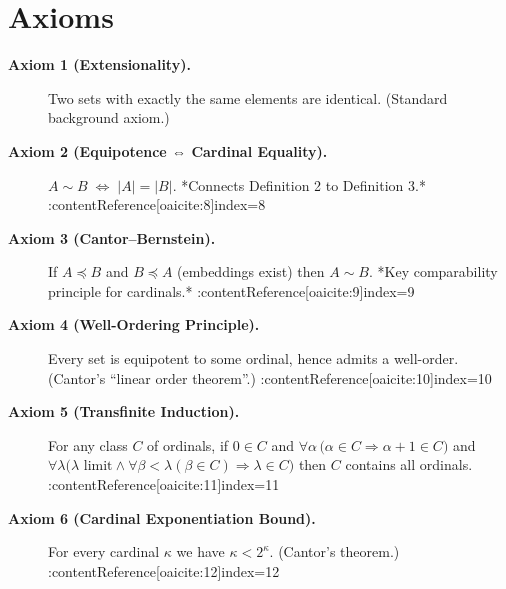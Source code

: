 \documentclass[11pt]{article}
\begin{document}
\section*{Axioms}
\begin{description}

\item[\textbf{Axiom 1 (Extensionality).}]
Two sets with exactly the same elements are identical.  (Standard
background axiom.)

\item[\textbf{Axiom 2 (Equipotence ⇔ Cardinal Equality).}]
$A\sim B \;\iff\; \lvert A\rvert=\lvert B\rvert$.  *Connects Definition 2
to Definition 3.* :contentReference[oaicite:8]{index=8}

\item[\textbf{Axiom 3 (Cantor–Bernstein).}]
If $A\preccurlyeq B$ and $B\preccurlyeq A$ (embeddings exist) then
$A\sim B$.  *Key comparability principle for cardinals.* :contentReference[oaicite:9]{index=9}

\item[\textbf{Axiom 4 (Well-Ordering Principle).}]
Every set is equipotent to some ordinal, hence admits a well-order.
(Cantor’s “linear order theorem”.) :contentReference[oaicite:10]{index=10}

\item[\textbf{Axiom 5 (Transfinite Induction).}]
For any class $C$ of ordinals, if $0\in C$ and
$\forall\alpha\,\bigl(\alpha\in C\Rightarrow\alpha+1\in C\bigr)$ and
$\forall\lambda\bigl(\text{$\lambda$ limit}\wedge
\forall\beta<\lambda(\beta\in C)\Rightarrow\lambda\in C\bigr)$ then
$C$ contains all ordinals. :contentReference[oaicite:11]{index=11}

\item[\textbf{Axiom 6 (Cardinal Exponentiation Bound).}]
For every cardinal $\kappa$ we have $\kappa<2^\kappa$.
(Cantor’s theorem.) :contentReference[oaicite:12]{index=12}

\end{description}

\end{document}
